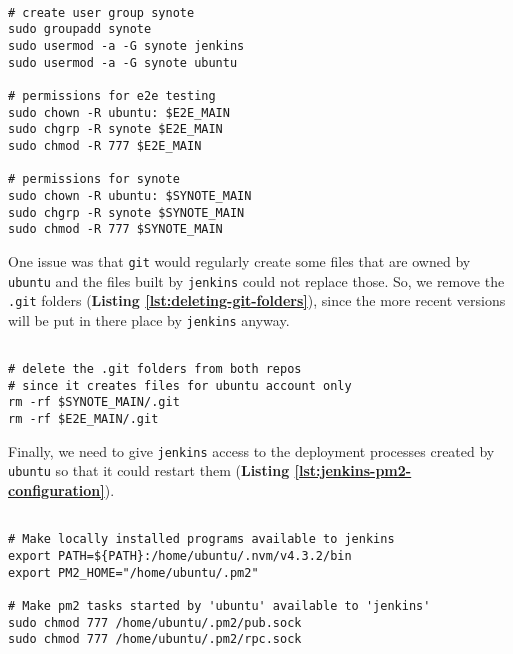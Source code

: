 \begin{listing}[H]
\begin{verbatim}

# create user group synote
sudo groupadd synote
sudo usermod -a -G synote jenkins
sudo usermod -a -G synote ubuntu

# permissions for e2e testing
sudo chown -R ubuntu: $E2E_MAIN
sudo chgrp -R synote $E2E_MAIN
sudo chmod -R 777 $E2E_MAIN

# permissions for synote
sudo chown -R ubuntu: $SYNOTE_MAIN
sudo chgrp -R synote $SYNOTE_MAIN
sudo chmod -R 777 $SYNOTE_MAIN

\end{verbatim}
\label{lst:deployment-folder-permissions}
\end{listing}

One issue was that \texttt{git} would regularly create some files that are owned by \texttt{ubuntu} and the files built by \texttt{jenkins} could not replace those. So, we remove the \texttt{.git} folders (\textbf{Listing \ref{lst:deleting-git-folders}}), since the more recent versions will be put in there place by \texttt{jenkins} anyway.

\begin{listing}[H]
\begin{verbatim}

# delete the .git folders from both repos
# since it creates files for ubuntu account only
rm -rf $SYNOTE_MAIN/.git
rm -rf $E2E_MAIN/.git

\end{verbatim}
\label{lst:deleting-git-folders}
\end{listing}

Finally, we need to give \texttt{jenkins} access to the deployment processes created by \texttt{ubuntu} so that it could restart them (\textbf{Listing \ref{lst:jenkins-pm2-configuration}}).

\begin{listing}[H]
\begin{verbatim}

# Make locally installed programs available to jenkins
export PATH=${PATH}:/home/ubuntu/.nvm/v4.3.2/bin
export PM2_HOME="/home/ubuntu/.pm2"

# Make pm2 tasks started by 'ubuntu' available to 'jenkins'
sudo chmod 777 /home/ubuntu/.pm2/pub.sock
sudo chmod 777 /home/ubuntu/.pm2/rpc.sock

\end{verbatim}
\label{lst:jenkins-pm2-configuration}
\end{listing}

